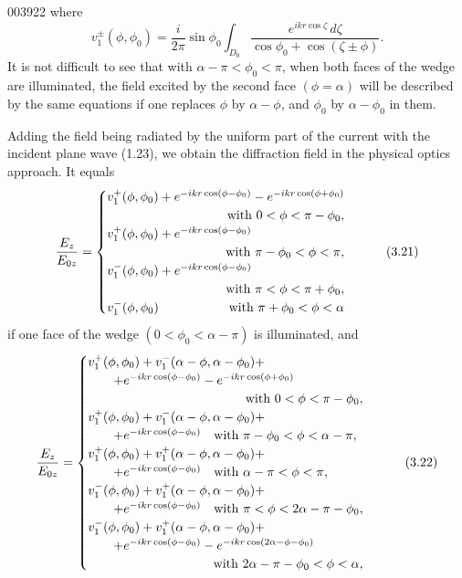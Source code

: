 \begin{scanpage}{0039}{22}
where
\[v_1^{\pm}(\phi,\phi_0)=\frac i{2\pi}\sin\phi_0\int_{D_0}\frac{e^{ikr\cos\zeta}\,d\zeta}{\cos\phi_0+\cos(\zeta\pm\phi)}.\tag{3.20}\]
It is not difficult to see that with $\alpha-\pi<\phi_0<\pi$, when both faces of the wedge are illuminated, the field excited by the second face $(\phi=\alpha)$ will be described by the same equations if one replaces $\phi$ by $\alpha-\phi$, and $\phi_0$ by $\alpha-\phi_0$ in them.

Adding the field being radiated by the uniform part of the current with the incident plane wave (1.23), we obtain the diffraction field in the physical optics approach. It equals
\[\frac{E_z}{E_{0z}}=\begin{cases}v_1^+(\phi,\phi_0)+e^{-ikr\cos(\phi-\phi_0)}-e^{-ikr\cos(\phi+\phi_0)}\\\hfill\text{with }0<\phi<\pi-\phi_0,\\v_1^+(\phi,\phi_0)+e^{-ikr\cos(\phi-\phi_0)}\\\hfill\text{with }\pi-\phi_0<\phi<\pi,\\v_1^-(\phi,\phi_0)+e^{-ikr\cos(\phi-\phi_0)}\\\hfill\text{with }\pi<\phi<\pi+\phi_0,\\v_1^-(\phi,\phi_0)\hfill\text{with }\pi+\phi_0<\phi<\alpha\end{cases}\tag{3.21}\]
if one face of the wedge $(0<\phi_0<\alpha-\pi)$ is illuminated, and
\[\frac{E_z}{E_{0z}}=\begin{cases}v_1^+(\phi,\phi_0)+v_1^-(\alpha-\phi,\alpha-\phi_0)+\\\qquad+e^{-ikr\cos(\phi-\phi_0)}-e^{-ikr\cos(\phi+\phi_0)}\\\hfill\text{with }0<\phi<\pi-\phi_0,\\v_1^+(\phi,\phi_0)+v_1^-(\alpha-\phi,\alpha-\phi_0)+\\\qquad+e^{-ikr\cos(\phi-\phi_0)}\quad\text{with }\pi-\phi_0<\phi<\alpha-\pi,\\v_1^+(\phi,\phi_0)+v_1^+(\alpha-\phi,\alpha-\phi_0)+\\\qquad+e^{-ikr\cos(\phi-\phi_0)}\quad\text{with }\alpha-\pi<\phi<\pi,\\v_1^-(\phi,\phi_0)+v_1^+(\alpha-\phi,\alpha-\phi_0)+\\\qquad+e^{-ikr\cos(\phi-\phi_0)}\quad\text{with }\pi<\phi<2\alpha-\pi-\phi_0,\\v_1^-(\phi,\phi_0)+v_1^+(\alpha-\phi,\alpha-\phi_0)+\\\qquad+e^{-ikr\cos(\phi-\phi_0)}-e^{-ikr\cos(2\alpha-\phi-\phi_0)}\\\hfill\text{with }2\alpha-\pi-\phi_0<\phi<\alpha,\end{cases}\tag{3.22}\]
\end{scanpage}
